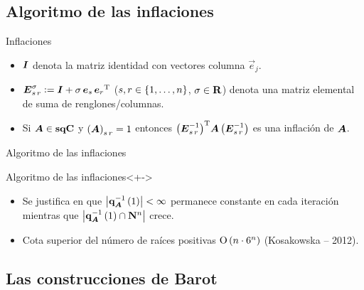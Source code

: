 \documentclass[spanish]{beamer}
\begin{document}
\subsection{Algoritmo de las inflaciones}
\begin{frame}{Inflaciones}
  \begin{definitions}
    \begin{itemize}[<+->]
      \item $\boldsymbol{I}$ denota la matriz identidad con vectores columna 
      $\vec{e}_j$.
      \item $\boldsymbol{E}_{{s} \, {r}}^{\sigma} \mathrel{\mathop:}= \boldsymbol{I} + \sigma \, \boldsymbol{e}_s \, 
      {\boldsymbol{e}_r}^{\operatorname{T}}$ ($s, r \in \left\{{1, \ldots, n}\right\}$, $\sigma \in 
      \mathbf{R}$) denota una \alert{matriz elemental} de suma de renglones/columnas.
      \item Si $\boldsymbol{A} \in \mathbf{sqC}$ y $\left({\boldsymbol{A}}\right)_{{s}\,{r}} = 1$ entonces 
      ${\left(\boldsymbol{E}_{{s} \, {r}}^{-1}\right)}^{\operatorname{T}} \boldsymbol{A} 
      \left(\boldsymbol{E}_{{s} \, {r}}^{-1}\right)$ es una \alert{inflación} de $\boldsymbol{A}$.
    \end{itemize}
  \end{definitions}
\end{frame}

\begin{frame}{Algoritmo de las inflaciones}
  \begin{block}{Algoritmo de las inflaciones}<+->
    \begin{algorithm}[H]
    \end{algorithm}
  \end{block}
  \begin{itemize}[<+->]
    \item Se justifica en que $\left|{\mathbf{q}_{\boldsymbol{A}}^{-1}\left(1\right)}\right| < 
    \infty$ permanece constante en cada iteración mientras que 
    $\left|{\mathbf{q}_{\boldsymbol{A}}^{-1}\left(1\right)\cap\mathbf{N}^n}\right|$ crece.
    \item Cota superior del número de raíces positivas $\operatorname{O}\left( n \cdot 6^{n} \right)$ (Kosakowska -- 2012).
  \end{itemize}
\end{frame}

\subsection{Las construcciones de Barot}
\end{document}
